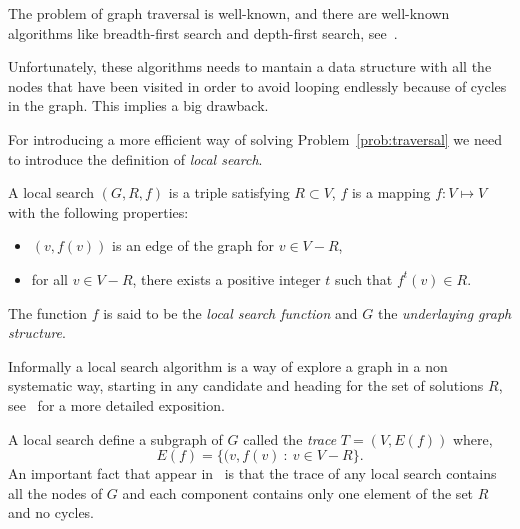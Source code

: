 \documentclass{article}
\begin{document}
The problem of graph traversal is well-known, and there are 
well-known algorithms like breadth-first search and depth-first
search, see~\cite[Page 597]{Cormen}. 

Unfortunately, these algorithms needs to mantain a data 
structure with all the nodes that have been visited in order to avoid
looping endlessly because of  cycles in the graph. This implies a big
drawback. %
  
For introducing a more efficient way of solving
Problem~\ref{prob:traversal} we need to introduce the definition of
\textit{local search}. 
\begin{definition}
  A local search  $(G, R, f)$ is a triple satisfying $R\subset V$, $f$
  is  a mapping $f: V\mapsto V$ with the following properties:
  \begin{itemize}
  \item $(v,f(v))$ is an edge of the graph for $v\in V- R$,
  \item for all $v\in  V- R$, there exists a positive integer $t$ such
    that $f^{t}(v)\in R$.
  \end{itemize}
  The function $f$ is said to be the \textit{local search function}
  and $G$ the \textit{underlaying graph structure}.
\end{definition}
Informally a local search algorithm is a way of explore a
graph in a non systematic way, starting in any candidate and heading
for the set of solutions $R$,  see~\cite[Page 110]{RussellNorvig} for
a more detailed exposition.  

A local search define a subgraph of $G$ called the \textit{trace} $T =
(V, E(f))$ where,
\begin{equation*}
  E(f) = \{(v,f(v)\ :\ v\in V- R\}.
\end{equation*}
An important fact that appear in~\cite[Property 2.1]{AvisFukuda} is
that the trace of any local search contains all the nodes of $G$ and
each component contains only one element of the set $R$ and no
cycles. 
\end{document}
